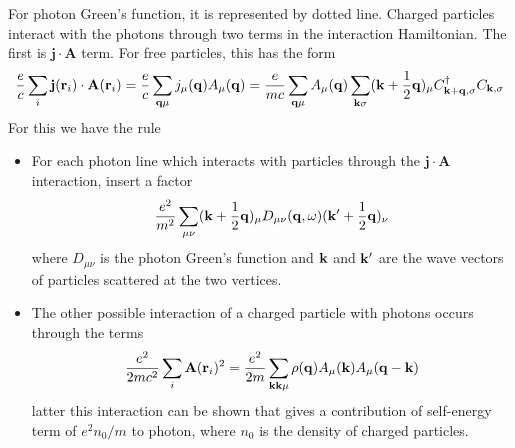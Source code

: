 For photon Green's function, it is represented by dotted line.
Charged particles interact with the photons through two terms in the interaction Hamiltonian.
The first is $\mathbf{j}\cdot \mathbf{A}$ term.
For free particles, this has the form
\begin{equation}
  \label{2.128}
  \frac{e}{c}\sum_i \mathbf{j}(\mathbf{r}_i)\cdot \mathbf{A}(\mathbf{r}_i) = \frac{e}{c} \sum_{\mathbf{q} \mu}j_\mu(\mathbf{q})A_\mu(\mathbf{q}) = \frac{e}{mc} \sum_{\mathbf{q} \mu}A_\mu(\mathbf{q})\sum_{\mathbf{k} \sigma} (\mathbf{k}+ \frac{1}{2}\mathbf{q})_\mu C^\dagger_{\mathbf{k}+\mathbf{q},\sigma}C_{\mathbf{k},\sigma}
\end{equation}
For this we have the rule
\begin{itemize}
  \item For each photon line which interacts with particles through the $\mathbf{j}\cdot\mathbf{A}$ interaction, insert a factor
  \begin{equation}
    \label{2.129}
    \frac{e^2}{m^2}\sum_{\mu\nu}(\mathbf{k}+ \frac{1}{2}\mathbf{q})_\mu D_{\mu\nu}(\mathbf{q},\omega)(\mathbf{k}'+\frac{1}{2}\mathbf{q})_\nu
  \end{equation}
  where $D_{\mu\nu}$ is the photon Green's function and $\mathbf{k}$ and $\mathbf{k}'$ are the wave vectors of particles scattered at the two vertices.
  \item The other possible interaction of a charged particle with photons occurs through the terms
  \begin{equation*}
    \frac{e^2}{2mc^2}\sum_i \mathbf{A}(\mathbf{r}_i)^2 = \frac{e^2}{2m} \sum_{\mathbf{k} \mathbf{k} \mu} \rho(\mathbf{q}) A_\mu(\mathbf{k}) A_\mu(\mathbf{q}-\mathbf{k})
  \end{equation*}
  latter this interaction can be shown that gives a contribution of self-energy term of $e^2n_0/m$ to photon, where $n_0$ is the density of charged particles.
\end{itemize}

